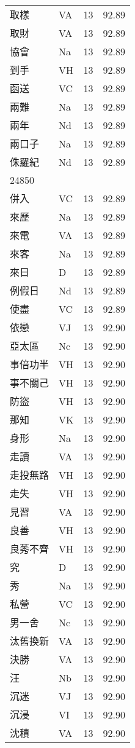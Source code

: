 \documentclass[twocolumn]{book}
\begin{document}
\begin{supertabular}{llrr}
取樣 & VA & 13 &  92.89\\
取財 & VA & 13 &  92.89\\
協會 & Na & 13 &  92.89\\
到手 & VH & 13 &  92.89\\
函送 & VC & 13 &  92.89\\
兩難 & Na & 13 &  92.89\\
兩年 & Nd & 13 &  92.89\\
兩口子 & Na & 13 &  92.89\\
侏羅紀 & Nd & 13 &  92.89\\
24850\\
併入 & VC & 13 &  92.89\\
來歷 & Na & 13 &  92.89\\
來電 & VA & 13 &  92.89\\
來客 & Na & 13 &  92.89\\
來日 & D & 13 &  92.89\\
例假日 & Nd & 13 &  92.89\\
使盡 & VC & 13 &  92.89\\
依戀 & VJ & 13 &  92.90\\
亞太區 & Nc & 13 &  92.90\\
事倍功半 & VH & 13 &  92.90\\
事不關己 & VH & 13 &  92.90\\
防盜 & VH & 13 &  92.90\\
那知 & VK & 13 &  92.90\\
身形 & Na & 13 &  92.90\\
走讀 & VA & 13 &  92.90\\
走投無路 & VH & 13 &  92.90\\
走失 & VH & 13 &  92.90\\
見習 & VA & 13 &  92.90\\
良善 & VH & 13 &  92.90\\
良莠不齊 & VH & 13 &  92.90\\
究 & D & 13 &  92.90\\
秀 & Na & 13 &  92.90\\
私營 & VC & 13 &  92.90\\
男一舍 & Nc & 13 &  92.90\\
汰舊換新 & VA & 13 &  92.90\\
決勝 & VA & 13 &  92.90\\
汪 & Nb & 13 &  92.90\\
沉迷 & VJ & 13 &  92.90\\
沉浸 & VI & 13 &  92.90\\
沈積 & VA & 13 &  92.90\\

\end{supertabular}
\end{document}
